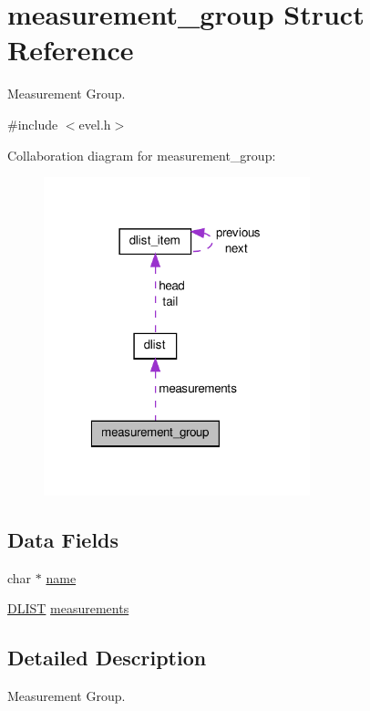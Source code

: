 \hypertarget{structmeasurement__group}{}\section{measurement\+\_\+group Struct Reference}
\label{structmeasurement__group}


Measurement Group.  




{\ttfamily \#include $<$evel.\+h$>$}



Collaboration diagram for measurement\+\_\+group\+:
\nopagebreak
\begin{figure}[H]
\begin{center}
\leavevmode
\includegraphics[width=219pt]{structmeasurement__group__coll__graph}
\end{center}
\end{figure}
\subsection*{Data Fields}
\begin{DoxyCompactItemize}
\item 
char $\ast$ \hyperlink{structmeasurement__group_a6ee37d1bc7453dad72b3da1a77c664bd}{name}
\item 
\hyperlink{double__list_8h_a45f4a129042d9e1aa4ffd31fe13e4d14}{D\+L\+I\+S\+T} \hyperlink{structmeasurement__group_a069f918991b814c3460b041253ad1cfa}{measurements}
\end{DoxyCompactItemize}


\subsection{Detailed Description}
Measurement Group. 


